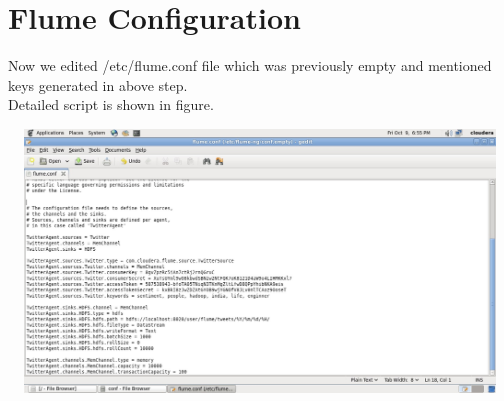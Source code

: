 \documentclass[a4paper,12pt]{report}
\begin{document}
\section{Flume Configuration}
Now we edited /etc/flume.conf file which was previously empty and mentioned keys generated in above step.\\
\hspace*{\parindent} Detailed script is shown in figure. 
\begin{center}
	\includegraphics[height=7cm,width=16cm]{images/flume.jpg}
\end{center}
\end{document}
